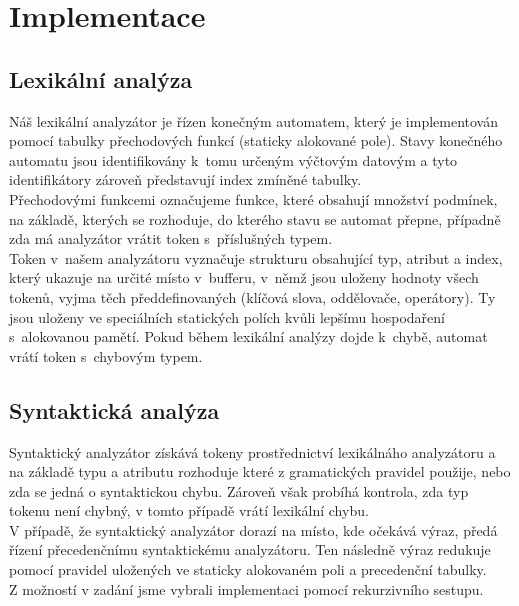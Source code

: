 \documentclass[11pt]{article}
\begin{document}
	\section{Implementace}
	
	\subsection{Lexikální analýza}
    	Náš lexikální analyzátor je řízen konečným automatem, který je implementován pomocí tabulky přechodových funkcí (staticky alokované pole). Stavy konečného automatu jsou identifikovány k~tomu určeným výčtovým datovým a tyto identifikátory zároveň představují index zmíněné tabulky. \\
    	\indent Přechodovými funkcemi označujeme funkce, které obsahují množství podmínek, na základě, kterých se rozhoduje, do kterého stavu se automat přepne, případně zda má analyzátor vrátit token s~příslušných typem. \\
     	\indent Token v~našem analyzátoru vyznačuje strukturu obsahující typ, atribut a index, který ukazuje na  určité místo v~bufferu, v~němž jsou uloženy hodnoty všech tokenů, vyjma těch předdefinovaných (klíčová slova, oddělovače, operátory). Ty jsou uloženy ve speciálních statických polích kvůli lepšímu hospodaření s~alokovanou pamětí. Pokud během lexikální analýzy dojde k~chybě, automat vrátí token s~chybovým typem. 

	\subsection{Syntaktická analýza}
	    Syntaktický analyzátor získává tokeny prostřednictví lexikálnáho analyzátoru a na základě typu a atributu rozhoduje které z gramatických pravidel použije, nebo zda se jedná o syntaktickou chybu. Zároveň však probíhá kontrola, zda typ tokenu není chybný, v tomto případě vrátí lexikální chybu. \\
	    \indent V případě, že syntaktický analyzátor dorazí na místo, kde očekává výraz, předá řízení přecedenčnímu syntaktickému analyzátoru. Ten následně výraz redukuje pomocí pravidel uložených ve staticky alokovaném poli a precedenční tabulky. \\
	    \indent Z možností v zadání jsme vybrali implementaci pomocí rekurzivního sestupu.
	
\end{document}
